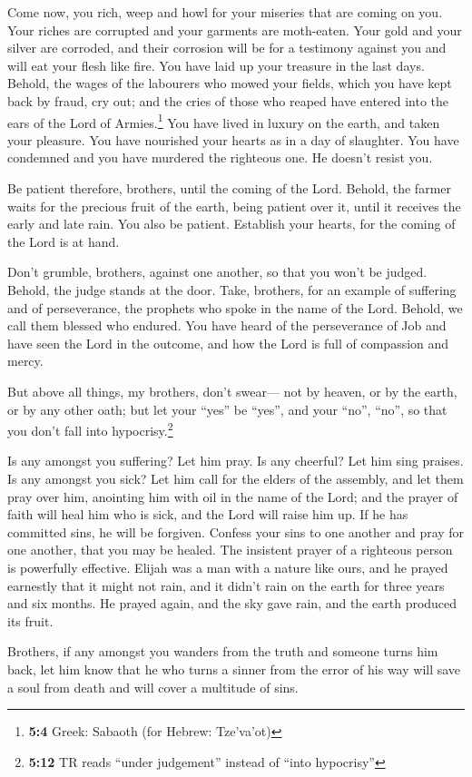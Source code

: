  Come now, you rich, weep and howl for your miseries that
are coming on you.  Your riches are corrupted and your
garments are moth-eaten.  Your gold and your silver are
corroded, and their corrosion will be for a testimony against you and
will eat your flesh like fire. You have laid up your treasure in the
last days.  Behold, the wages of the labourers who mowed
your fields, which you have kept back by fraud, cry out; and the cries
of those who reaped have entered into the ears of the Lord of
Armies.\footnote{\textbf{5:4} Greek: Sabaoth (for Hebrew: Tze'va'ot)}
 You have lived in luxury on the earth, and taken your
pleasure. You have nourished your hearts as in a day of slaughter.
 You have condemned and you have murdered the righteous
one. He doesn't resist you.

 Be patient therefore, brothers, until the coming of the
Lord. Behold, the farmer waits for the precious fruit of the earth,
being patient over it, until it receives the early and late rain.
 You also be patient. Establish your hearts, for the
coming of the Lord is at hand.

 Don't grumble, brothers, against one another, so that you
won't be judged. Behold, the judge stands at the door. 
Take, brothers, for an example of suffering and of perseverance, the
prophets who spoke in the name of the Lord.  Behold, we
call them blessed who endured. You have heard of the perseverance of Job
and have seen the Lord in the outcome, and how the Lord is full of
compassion and mercy.

 But above all things, my brothers, don't swear--- not by
heaven, or by the earth, or by any other oath; but let your ``yes'' be
``yes'', and your ``no'', ``no'', so that you don't fall into
hypocrisy.\footnote{\textbf{5:12} TR reads ``under judgement'' instead
  of ``into hypocrisy''}

 Is any amongst you suffering? Let him pray. Is any
cheerful? Let him sing praises.  Is any amongst you sick?
Let him call for the elders of the assembly, and let them pray over him,
anointing him with oil in the name of the Lord;  and the
prayer of faith will heal him who is sick, and the Lord will raise him
up. If he has committed sins, he will be forgiven. 
Confess your sins to one another and pray for one another, that you may
be healed. The insistent prayer of a righteous person is powerfully
effective.  Elijah was a man with a nature like ours, and
he prayed earnestly that it might not rain, and it didn't rain on the
earth for three years and six months.  He prayed again,
and the sky gave rain, and the earth produced its fruit.

 Brothers, if any amongst you wanders from the truth and
someone turns him back,  let him know that he who turns a
sinner from the error of his way will save a soul from death and will
cover a multitude of sins.
